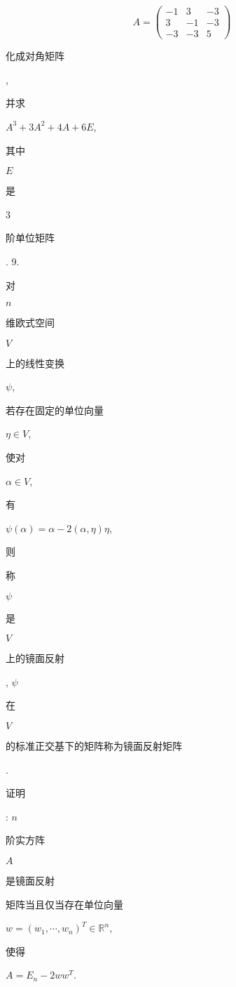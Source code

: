 \documentclass[10pt]{article}
\begin{document}
$$
A=\left(\begin{array}{ccc}
-1 & 3 & -3 \\
3 & -1 & -3 \\
-3 & -3 & 5
\end{array}\right)
$$
\begin{CJK}{UTF8}{mj}化成对角矩阵\end{CJK}, \begin{CJK}{UTF8}{mj}并求\end{CJK} $A^{3}+3 A^{2}+4 A+6 E$, \begin{CJK}{UTF8}{mj}其中\end{CJK} $E$ \begin{CJK}{UTF8}{mj}是\end{CJK} 3 \begin{CJK}{UTF8}{mj}阶单位矩阵\end{CJK}. 9. \begin{CJK}{UTF8}{mj}对\end{CJK} $n$ \begin{CJK}{UTF8}{mj}维欧式空间\end{CJK} $V$ \begin{CJK}{UTF8}{mj}上的线性变换\end{CJK} $\psi$, \begin{CJK}{UTF8}{mj}若存在固定的单位向量\end{CJK} $\eta \in V$, \begin{CJK}{UTF8}{mj}使对\end{CJK} $\alpha \in V$, \begin{CJK}{UTF8}{mj}有\end{CJK} $\psi(\alpha)=\alpha-2(\alpha, \eta) \eta$, \begin{CJK}{UTF8}{mj}则\end{CJK} \begin{CJK}{UTF8}{mj}称\end{CJK} $\psi$ \begin{CJK}{UTF8}{mj}是\end{CJK} $V$ \begin{CJK}{UTF8}{mj}上的镜面反射\end{CJK}, $\psi$ \begin{CJK}{UTF8}{mj}在\end{CJK} $V$ \begin{CJK}{UTF8}{mj}的标准正交基下的矩阵称为镜面反射矩阵\end{CJK}. \begin{CJK}{UTF8}{mj}证明\end{CJK}: $n$ \begin{CJK}{UTF8}{mj}阶实方阵\end{CJK} $A$ \begin{CJK}{UTF8}{mj}是镜面反射\end{CJK} \begin{CJK}{UTF8}{mj}矩阵当且仅当存在单位向量\end{CJK} $w=\left(w_{1}, \cdots, w_{n}\right)^{T} \in \mathbb{R}^{n}$, \begin{CJK}{UTF8}{mj}使得\end{CJK} $A=E_{n}-2 w w^{T}$.
\end{document}
